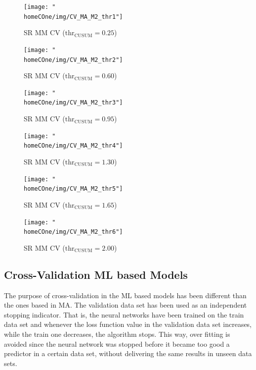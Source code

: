 \documentclass[a4paper]{article}
\newcommand{\homeCOne}{../../Chapter 1 - Metalabeling/Draft}
\begin{document}
\begin{figure}[htbp]
\centering
\begin{minipage}{.5\textwidth}
  \centering
  \texttt{[image: "\\homeCOne/img/CV\_MA\_M2\_thr1"]}
  \caption{SR MM CV ($\text{thr}_{\text{CUSUM}} = 0.25$)}
  \label{fig:thr1}
\end{minipage}%
\begin{minipage}{.5\textwidth}
  \centering
  \texttt{[image: "\\homeCOne/img/CV\_MA\_M2\_thr2"]}
  \caption{SR MM CV ($\text{thr}_{\text{CUSUM}} = 0.60$)}
  \label{fig:thr2}
\end{minipage}
\end{figure}

\begin{figure}[htbp]
\centering
\begin{minipage}{.5\textwidth}
  \centering
  \texttt{[image: "\\homeCOne/img/CV\_MA\_M2\_thr3"]}
  \caption{SR MM CV ($\text{thr}_{\text{CUSUM}} = 0.95$)}
  \label{fig:thr3}
\end{minipage}%
\begin{minipage}{.5\textwidth}
  \centering
  \texttt{[image: "\\homeCOne/img/CV\_MA\_M2\_thr4"]}
  \caption{SR MM CV ($\text{thr}_{\text{CUSUM}} = 1.30$)}
  \label{fig:thr4}
\end{minipage}
\end{figure}

\begin{figure}[htbp]
\centering
\begin{minipage}{.5\textwidth}
  \centering
  \texttt{[image: "\\homeCOne/img/CV\_MA\_M2\_thr5"]}
  \caption{SR MM CV ($\text{thr}_{\text{CUSUM}} = 1.65$)}
  \label{fig:thr5}
\end{minipage}%
\begin{minipage}{.5\textwidth}
  \centering
  \texttt{[image: "\\homeCOne/img/CV\_MA\_M2\_thr6"]}
  \caption{SR MM CV ($\text{thr}_{\text{CUSUM}} = 2.00$)}
  \label{fig:thr6}
\end{minipage}
\end{figure}

\vspace{5cm}

\subsection{Cross-Validation ML based Models}
The purpose of cross-validation in the ML based models has been 
different than the ones based in MA. The validation data set has been 
used as an independent stopping indicator. That is, the neural 
networks have been trained on the train data set and whenever the loss 
function value in the validation data set increases, while the train 
one decreases, the algorithm stops. This way, over fitting is avoided 
since the neural network was stopped before it became too good a 
predictor in a certain data set, without delivering the same results 
in unseen data sets.\\
\end{document}
